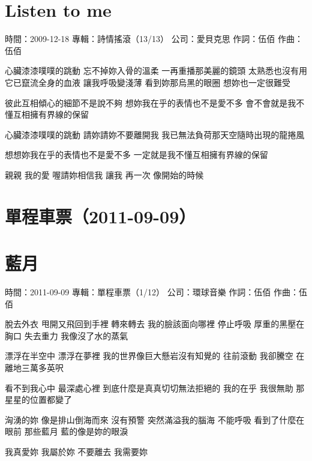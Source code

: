 \documentclass[UTF8,a4paper,oneside,twocolumn,12pt]{ctexbook}
\newcommand{\infopair}[2]{\textbullet #1：#2}
\newcommand{\zc}[1][伍佰]{\infopair{作詞}{#1}}
\newcommand{\zq}[1][伍佰]{\infopair{作曲}{#1}}
\newcommand{\zj}[1]{\infopair{專輯}{#1}}
\newcommand{\sj}[1]{\infopair{時間}{#1}}
\newcommand{\gs}[1]{\infopair{公司}{#1}}
\newenvironment{info}{\begin{flushleft}\kaishu
	}
	{\end{flushleft}\normalsize\yahei\par}
\newenvironment{lyric}{
	}
{}
\begin{document}
\section{Listen to me}
\begin{info}
	\sj{2009-12-18}
	\zj{詩情搖滾（13/13）}
	\gs{愛貝克思}
	\zc
	\zq
\end{info}
\begin{lyric}
	心臟漆漆噗噗的跳動 忘不掉妳入骨的溫柔
	一再重播那美麗的鏡頭 太熟悉也沒有用
	它已竄流全身的血液 讓我呼吸變淺薄
	看到妳那烏黑的眼圈 想妳也一定很難受

	彼此互相傾心的細節不是說不夠
	想妳我在乎的表情也不是愛不多
	會不會就是我不懂互相擁有界線的保留

	心臟漆漆噗噗的跳動 請妳請妳不要離開我
	我已無法負荷那天空隨時出現的龍捲風

	想想妳我在乎的表情也不是愛不多
	一定就是我不懂互相擁有界線的保留

	親親 我的愛 喔請妳相信我
	讓我 再一次 像開始的時候
\end{lyric}

\section*{單程車票（2011-09-09）}
\section{藍月}
\begin{info}
	\sj{2011-09-09}
	\zj{單程車票（1/12）}
	\gs{環球音樂}
	\zc
	\zq
\end{info}
\begin{lyric}
	脫去外衣 甩開又飛回到手裡
	轉來轉去 我的臉該面向哪裡
	停止呼吸 厚重的黑壓在胸口
	失去重力 我像沒了水的蒸氣

	漂浮在半空中 漂浮在夢裡
	我的世界像巨大懸岩沒有知覺的
	往前滾動 我卻騰空
	在離地三萬多英呎

	看不到我心中 最深處心裡
	到底什麼是真真切切無法拒絕的
	我的在乎 我很無助
	那星星的位置都變了

	洶湧的妳 像是排山倒海而來
	沒有預警 突然滿溢我的腦海
	不能呼吸 看到了什麼在眼前
	那些藍月 藍的像是妳的眼淚

	我真愛妳 我屬於妳
	不要離去 我需要妳
\end{lyric}
\end{document}
